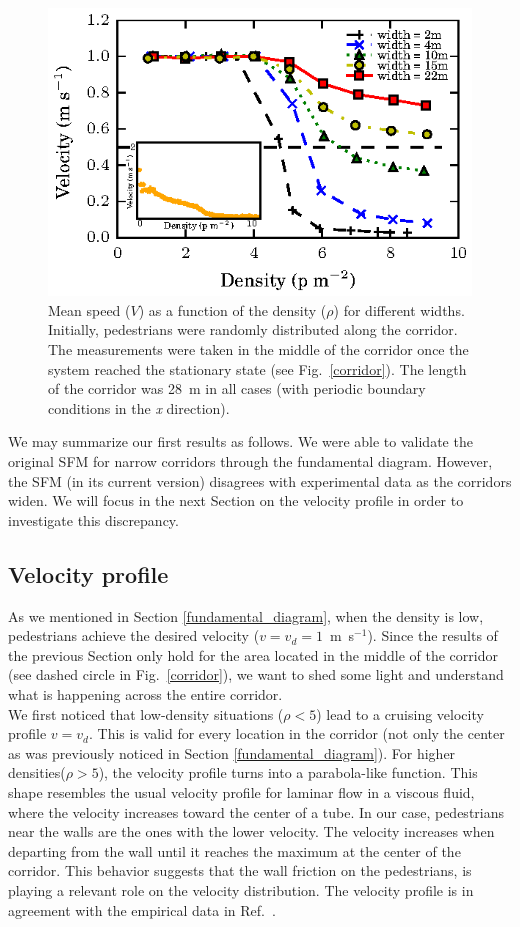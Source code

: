 \documentclass[preprint,12pt]{elsarticle}
\begin{document}
\begin{figure}[htbp!]
\centering
\includegraphics[width=0.7\columnwidth]
{./speed-density_vd1_multiple_widths.eps}
\caption{\label{fundamental_diagram_speed} Mean speed ($V$) as a function of the density ($\rho$) for different widths. Initially, 
pedestrians were randomly distributed along the corridor. The measurements were taken in the middle
of the corridor once the system reached the stationary state (see Fig.~\ref{corridor}). The length of the corridor 
was 28~m in all cases (with periodic boundary conditions in the \textit{x} direction).}
\end{figure}

We may summarize our first results as follows. We were able to validate the 
original SFM for narrow corridors through the fundamental 
diagram. However, the SFM (in its current version) disagrees with experimental 
data as the corridors widen. We will focus in the next Section on the velocity 
profile in order to investigate this discrepancy. 

\subsection{\label{velocity_profile} Velocity profile}

As we mentioned in Section \ref{fundamental_diagram}, when the density is low, pedestrians achieve the desired velocity ($v=v_d=1$~m~s$^{-1}$). Since the results of the previous Section only hold for the area located in the middle of the corridor (see dashed circle in Fig.~\ref{corridor}), we want to shed some light and understand what is happening across the entire corridor.\\

We first noticed that low-density situations ($\rho<5$) lead to a cruising velocity profile $v=v_d$. This is valid for every location in the corridor (not only the center as was previously noticed in Section \ref{fundamental_diagram}). For higher densities($\rho>5$), the velocity profile turns into a parabola-like function. This shape resembles the usual velocity profile for laminar flow in a viscous fluid, where the velocity increases toward the center of a tube. In our case, pedestrians near the walls are the ones with the lower velocity. The velocity increases when departing from the wall until it reaches the maximum at the center of the corridor. This behavior suggests that the wall friction on the pedestrians, is playing a relevant role on the velocity distribution. The velocity profile is in agreement with the empirical data in Ref.~\cite{zhang1}.  \\
\end{document}
